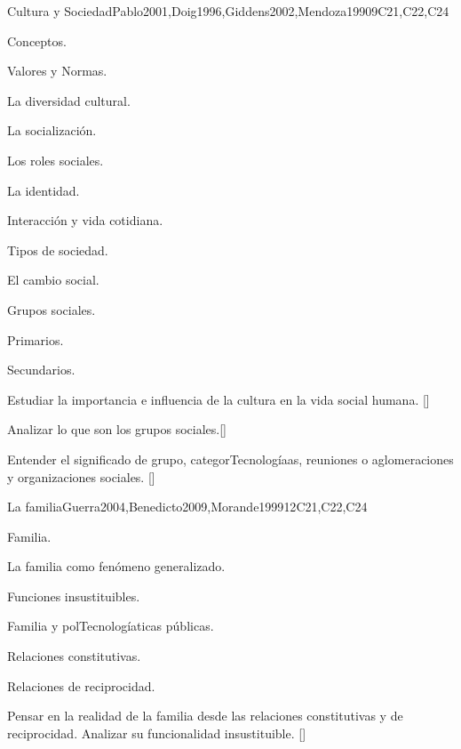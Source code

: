 \begin{syllabus}
\begin{unit}{}{Cultura y Sociedad}{Pablo2001,Doig1996,Giddens2002,Mendoza1990}{9}{C21,C22,C24}
\begin{topics}
    \item Conceptos.
    \item Valores y Normas.
    \item La diversidad cultural.
    \item La socialización.
    \item Los roles sociales.
    \item La identidad.
    \item Interacción y vida cotidiana.
    \item Tipos de sociedad.
    \item El cambio social.
    \item Grupos sociales.
    \begin{subtopics}
	    \item Primarios.
	    \item Secundarios.
    \end{subtopics}
\end{topics}

\begin{learningoutcomes}
    \item Estudiar la importancia e influencia de la cultura en la vida social humana. [\Familiarity]
    \item Analizar lo que son los grupos sociales.[\Familiarity]
    \item Entender el significado de grupo, categorTecnologíaas, reuniones o aglomeraciones y organizaciones sociales. [\Familiarity]
\end{learningoutcomes}
\end{unit}

\begin{unit}{}{La familia}{Guerra2004,Benedicto2009,Morande1999}{12}{C21,C22,C24}
\begin{topics}
    \item Familia.
    \item La familia como fenómeno generalizado.
    \item Funciones insustituibles.
    \item Familia y polTecnologíaticas públicas.
    \item Relaciones constitutivas.
    \item Relaciones de reciprocidad.
\end{topics}
\begin{learningoutcomes}
	\item Pensar en la realidad de la familia desde las relaciones constitutivas y de reciprocidad. Analizar su funcionalidad insustituible. [\Familiarity]
\end{learningoutcomes}
\end{unit}


\end{syllabus}
